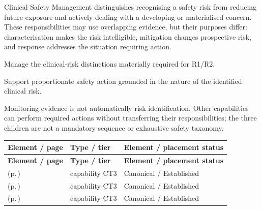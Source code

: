 Clinical Safety Management distinguishes recognising a safety risk from reducing future exposure and actively dealing with a developing or materialised concern. These responsibilities may use overlapping evidence, but their purposes differ: characterisation makes the risk intelligible, mitigation changes prospective risk, and response addresses the situation requiring action.



Manage the clinical-risk distinctions materially required for R1/\allowbreak{}R2.



Support proportionate safety action grounded in the nature of the identified clinical risk.



Monitoring evidence is not automatically risk identification. Other capabilities can perform required actions without transferring their responsibilities; the three children are not a mandatory sequence or exhaustive safety taxonomy.


\begingroup\small\setlength{\TableWidth}{\dimexpr\linewidth-6\tabcolsep-4\arrayrulewidth\relax}
\begin{longtable}{|>{\raggedright\arraybackslash}p{0.52\TableWidth}|>{\raggedright\arraybackslash}p{0.2\TableWidth}|>{\raggedright\arraybackslash}p{0.28\TableWidth}|}
\hline\rowcolor{TableHead}\textbf{Element / page} & \textbf{Type / tier} & \textbf{Element / placement status}\\\hline\endfirsthead
\hline\rowcolor{TableHead}\textbf{Element / page} & \textbf{Type / tier} & \textbf{Element / placement status}\\\hline\endhead
\hline\endfoot
\nameref{cap:bc-clinical-risk-identification} (p.\,\pageref{cap:bc-clinical-risk-identification}) & capability CT3 & Canonical / Established\\\hline
\nameref{cap:bc-clinical-risk-mitigation-management} (p.\,\pageref{cap:bc-clinical-risk-mitigation-management}) & capability CT3 & Canonical / Established\\\hline
\nameref{cap:bc-clinical-risk-response-management} (p.\,\pageref{cap:bc-clinical-risk-response-management}) & capability CT3 & Canonical / Established\\\hline
\end{longtable}\endgroup

